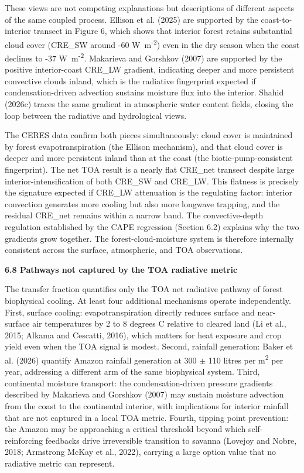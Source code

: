 These views are not competing explanations but descriptions of different aspects of the same coupled process. Ellison et al. (2025) are supported by the coast-to-interior transect in Figure 6, which shows that interior forest retains substantial cloud cover (CRE\_SW around -60 W~m\textsuperscript{-2}) even in the dry season when the coast declines to -37 W~m\textsuperscript{-2}. Makarieva and Gorshkov (2007) are supported by the positive interior-coast CRE\_LW gradient, indicating deeper and more persistent convective clouds inland, which is the radiative fingerprint expected if condensation-driven advection sustains moisture flux into the interior. Shahid (2026c) traces the same gradient in atmospheric water content fields, closing the loop between the radiative and hydrological views.

The CERES data confirm both pieces simultaneously: cloud cover is maintained by forest evapotranspiration (the Ellison mechanism), and that cloud cover is deeper and more persistent inland than at the coast (the biotic-pump-consistent fingerprint). The net TOA result is a nearly flat CRE\_net transect despite large interior-intensification of both CRE\_SW and CRE\_LW. This flatness is precisely the signature expected if CRE\_LW attenuation is the regulating factor: interior convection generates more cooling but also more longwave trapping, and the residual CRE\_net remains within a narrow band. The convective-depth regulation established by the CAPE regression (Section 6.2) explains why the two gradients grow together. The forest-cloud-moisture system is therefore internally consistent across the surface, atmospheric, and TOA observations.

\textbf{6.8 Pathways not captured by the TOA radiative metric}

The transfer fraction quantifies only the TOA net radiative pathway of forest biophysical cooling. At least four additional mechanisms operate independently. First, surface cooling: evapotranspiration directly reduces surface and near-surface air temperatures by 2 to 8 degrees C relative to cleared land (Li et al., 2015; Alkama and Cescatti, 2016), which matters for heat exposure and crop yield even when the TOA signal is modest. Second, rainfall generation: Baker et al. (2026) quantify Amazon rainfall generation at 300 \(\pm\) 110 litres per m\textsuperscript{2} per year, addressing a different arm of the same biophysical system. Third, continental moisture transport: the condensation-driven pressure gradients described by Makarieva and Gorshkov (2007) may sustain moisture advection from the coast to the continental interior, with implications for interior rainfall that are not captured in a local TOA metric. Fourth, tipping point prevention: the Amazon may be approaching a critical threshold beyond which self-reinforcing feedbacks drive irreversible transition to savanna (Lovejoy and Nobre, 2018; Armstrong McKay et al., 2022), carrying a large option value that no radiative metric can represent.

